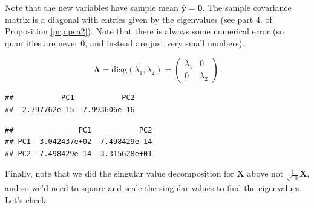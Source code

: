 \documentclass[
]{book}
\newenvironment{Shaded}{\begin{snugshade}}{\end{snugshade}}
\newcommand{\CommentTok}[1]{\textcolor[rgb]{0.56,0.35,0.01}{\textit{#1}}}
\newcommand{\DecValTok}[1]{\textcolor[rgb]{0.00,0.00,0.81}{#1}}
\newcommand{\FunctionTok}[1]{\textcolor[rgb]{0.13,0.29,0.53}{\textbf{#1}}}
\newcommand{\NormalTok}[1]{#1}
\newcommand{\SpecialCharTok}[1]{\textcolor[rgb]{0.81,0.36,0.00}{\textbf{#1}}}
\theoremstyle{definition}
\theoremstyle{definition}
\theoremstyle{definition}
\theoremstyle{definition}
\theoremstyle{remark}
\begin{document}
Note that the new variables have sample mean \(\bar{\mathbf y}={\boldsymbol 0}\). The sample covariance matrix is a diagonal with entries given by the eigenvalues (see part 4. of Proposition \ref{prp:pca2}). Note that there is always some numerical error (so quantities are never 0, and instead are just very small numbers).

\[
\boldsymbol \Lambda= \text{diag}(\lambda_1,\lambda_2) =  \begin{pmatrix} \lambda_1 & 0 \\ 0 & \lambda_2 \end{pmatrix}.
\]

\begin{Shaded}
\end{Shaded}

\begin{verbatim}
##           PC1           PC2 
##  2.797762e-15 -7.993606e-16
\end{verbatim}

\begin{Shaded}
\end{Shaded}

\begin{verbatim}
##               PC1           PC2
## PC1  3.042437e+02 -7.498429e-14
## PC2 -7.498429e-14  3.315628e+01
\end{verbatim}

Finally, note that we did the singular value decomposition for \(\mathbf X\) above not \(\frac{1}{\sqrt{10}}\mathbf X\), and so we'd need to square and scale the singular values to find the eigenvalues. Let's check:

\begin{Shaded}
\end{Shaded}
\end{document}
